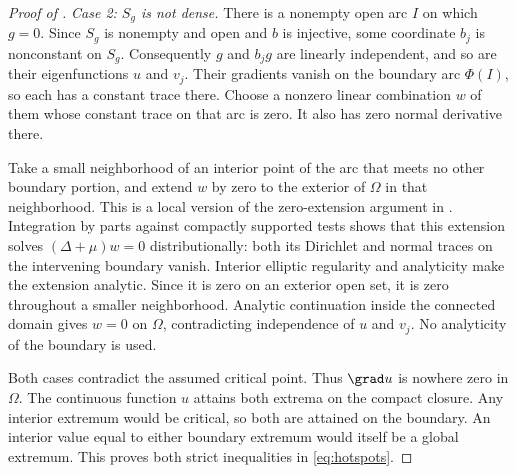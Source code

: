 \begin{proof}[Proof of ]
\smallskip\noindent
\emph{Case 2: $S_g$ is not dense.}
There is a nonempty open arc $I$ on which $g=0$. Since $S_g$ is nonempty and open and $b$ is injective, some coordinate $b_j$ is nonconstant on $S_g$. Consequently $g$ and $b_jg$ are linearly independent, and so are their eigenfunctions $u$ and $v_j$. Their gradients vanish on the boundary arc $\Phi(I)$, so each has a constant trace there. Choose a nonzero linear combination $w$ of them whose constant trace on that arc is zero. It also has zero normal derivative there.

Take a small neighborhood of an interior point of the arc that meets no other boundary portion, and extend $w$ by zero to the exterior of $\Omega$ in that neighborhood. This is a local version of the zero-extension argument in \cite[Lemma, p.~414]{Filonov2005}. Integration by parts against compactly supported tests shows that this extension solves $(\Delta+\mu)w=0$ distributionally: both its Dirichlet and normal traces on the intervening boundary vanish. Interior elliptic regularity and analyticity make the extension analytic. Since it is zero on an exterior open set, it is zero throughout a smaller neighborhood. Analytic continuation inside the connected domain gives $w=0$ on $\Omega$, contradicting independence of $u$ and $v_j$. No analyticity of the boundary is used.

Both cases contradict the assumed critical point. Thus $\grad u$ is nowhere zero in $\Omega$. The continuous function $u$ attains both extrema on the compact closure. Any interior extremum would be critical, so both are attained on the boundary. An interior value equal to either boundary extremum would itself be a global extremum. This proves both strict inequalities in \eqref{eq:hotspots}.
\end{proof}

